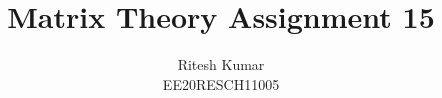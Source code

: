 \documentclass[journal,12pt,twocolumn]{IEEEtran}
\DeclareMathOperator*{\Res}{Res}
\begin{document}
	
	
	\newtheorem{theorem}{Theorem}[section]
	\newtheorem{problem}{Problem}
	\newtheorem{proposition}{Proposition}[section]
	\newtheorem{lemma}{Lemma}[section]
	\newtheorem{corollary}[theorem]{Corollary}
	\newtheorem{example}{Example}[section]
	\newtheorem{definition}[problem]{Definition}
	\newcommand\bigZero[1][17]{\mbox{\fontsize{#1}{0}\selectfont$0$}}
	\newcommand{\BEQA}{\begin{eqnarray}}
	\newcommand{\EEQA}{\end{eqnarray}}
	\newcommand{\define}{\stackrel{\triangle}{=}}
	
	\providecommand{\mbf}{\mathbf}
	\providecommand{\pr}[1]{\ensuremath{\Pr\left(#1\right)}}
	\providecommand{\qfunc}[1]{\ensuremath{Q\left(#1\right)}}
	\providecommand{\sbrak}[1]{\ensuremath{{}\left[#1\right]}}
	\providecommand{\lsbrak}[1]{\ensuremath{{}\left[#1\right.}}
	\providecommand{\rsbrak}[1]{\ensuremath{{}\left.#1\right]}}
	\providecommand{\brak}[1]{\ensuremath{\left(#1\right)}}
	\providecommand{\lbrak}[1]{\ensuremath{\left(#1\right.}}
	\providecommand{\rbrak}[1]{\ensuremath{\left.#1\right)}}
	\providecommand{\cbrak}[1]{\ensuremath{\left\{#1\right\}}}
	\providecommand{\lcbrak}[1]{\ensuremath{\left\{#1\right.}}
	\providecommand{\rcbrak}[1]{\ensuremath{\left.#1\right\}}}
	\theoremstyle{remark}
	\newtheorem{rem}{Remark}
	\newcommand{\sgn}{\mathop{\mathrm{sgn}}}
	\providecommand{\abs}[1]{\left\vert#1\right\vert}
	\providecommand{\res}[1]{\Res\displaylimits_{#1}} 
	\providecommand{\norm}[1]{\left\lVert#1\right\rVert}
	\providecommand{\mtx}[1]{\mathbf{#1}}
	\providecommand{\mean}[1]{E\left[ #1 \right]}
	\providecommand{\fourier}{\overset{\mathcal{F}}{ \rightleftharpoons}}
	\providecommand{\system}{\overset{\mathcal{H}}{ \longleftrightarrow}}
	\newcommand{\solution}{\noindent \textbf{Solution: }}
	\newcommand{\cosec}{\,\text{cosec}\,}
	\providecommand{\dec}[2]{\ensuremath{\overset{#1}{\underset{#2}{\gtrless}}}}
	\newcommand{\myvec}[1]{\ensuremath{\begin{pmatrix}#1\end{pmatrix}}}
	\newcommand{\mydet}[1]{\ensuremath{\begin{vmatrix}#1\end{vmatrix}}}
	\makeatletter
	\makeatother
	\let\StandardTheFigure\thefigure
	\let\vec\mathbf
	\renewcommand{\thefigure}{\theproblem}
	\def\putbox#1#2#3{\makebox[0in][l]{\makebox[#1][l]{}\raisebox{\baselineskip}[0in][0in]{\raisebox{#2}[0in][0in]{#3}}}}
	\def\rightbox#1{\makebox[0in][r]{#1}}
	\def\centbox#1{\makebox[0in]{#1}}
	\def\topbox#1{\raisebox{-\baselineskip}[0in][0in]{#1}}
	\def\midbox#1{\raisebox{-0.5\baselineskip}[0in][0in]{#1}}
	\vspace{3cm}
	\title{Matrix Theory Assignment 15}
	\author{Ritesh Kumar \\ EE20RESCH11005}
	
\end{document}
